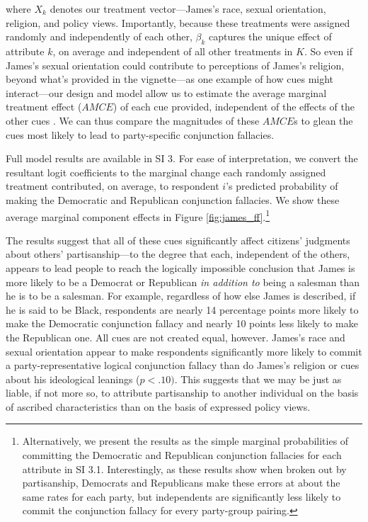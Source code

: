 \documentclass[12pt, letterpaper]{article}
\begin{document}
\noindent where $X_{k}$ denotes our treatment vector---James's race, sexual orientation, religion, and policy views. Importantly, because these treatments were assigned randomly and independently of each other, $\beta_{k}$ captures the unique effect of attribute $k$, on average and independent of all other treatments in $K$. So even if James's sexual orientation could contribute to perceptions of James's religion, beyond what's provided in the vignette---as one example of how cues might interact---our design and model allow us to estimate the average marginal treatment effect ($AMCE$) of each cue provided, independent of the effects of the other cues \citep{hainmueller2013causal}. We can thus compare the magnitudes of these $AMCE$s to glean the cues most likely to lead to party-specific conjunction fallacies.

Full model results are available in SI 3. For ease of interpretation, we convert the resultant logit coefficients to the marginal change each randomly assigned treatment contributed, on average, to respondent $i$'s predicted probability of making the Democratic and Republican conjunction fallacies. We show these average marginal component effects in Figure \ref{fig:james_ff}.\footnote{Alternatively, we present the results as the simple marginal probabilities of committing the Democratic and Republican conjunction fallacies for each attribute in SI 3.1. Interestingly, as these results show when broken out by partisanship, Democrats and Republicans make these errors at about the same rates for each party, but independents are significantly less likely to commit the conjunction fallacy for every party-group pairing.} 

The results suggest that all of these cues significantly affect citizens' judgments about others' partisanship---to the degree that each, independent of the others, appears to lead people to reach the logically impossible conclusion that James is more likely to be a Democrat or Republican \emph{in addition to} being a salesman than he is to be a salesman. For example, regardless of how else James is described, if he is said to be Black, respondents are nearly 14 percentage points more likely to make the Democratic conjunction fallacy and nearly 10 points less likely to make the Republican one. All cues are not created equal, however. James's race and sexual orientation appear to make respondents significantly more likely to commit a party-representative logical conjunction fallacy than do James's religion or cues about his ideological leanings ($p < .10)$. This suggests that we may be just as liable, if not more so, to attribute partisanship to another individual on the basis of ascribed characteristics than on the basis of expressed policy views. 
\end{document}
